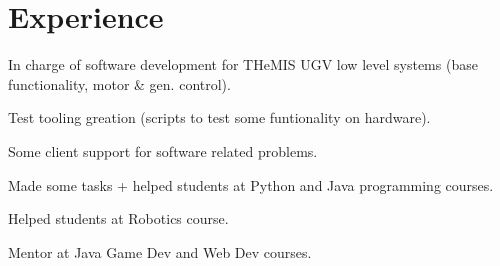\documentclass[letterpaper]{deedy-resume} %
\begin{document}
\begin{minipage}[t]{0.66\textwidth} %


\section{Experience}


\vspace{\topsep} %
\begin{tightitemize}
  \item In charge of software development for THeMIS UGV low level systems (base functionality, motor \& gen. control).
  \item Test tooling greation (scripts to test some funtionality on hardware).
  \item Some client support for software related problems.
\end{tightitemize}

\sectionspace %



\begin{tightitemize}
\item Made some tasks + helped students at Python and Java programming courses.
\item Helped students at Robotics course.
\item Mentor at Java Game Dev and Web Dev courses.
\end{tightitemize}

\sectionspace %




\end{minipage}
\end{document}
